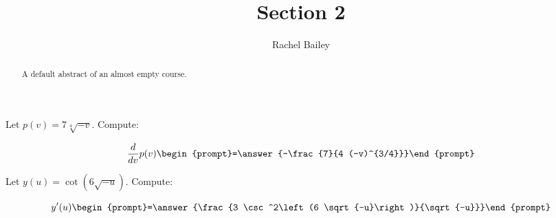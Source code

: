 \documentclass{ximera}
\title{Section 2}
\author{Rachel Bailey}
\begin{document}
\begin{abstract}
    A default abstract of an almost empty course.
\end{abstract}
\maketitle


\begin{exercise}
Let $p(v) = 7 \sqrt[4]{-v}$. Compute:

\[
\frac{d}{dv}p(v)
\begin{prompt}=\answer{-\frac{7}{4 (-v)^{3/4}}}\end{prompt}
\]
\end{exercise}

\begin{exercise}
Let $y(u) = \cot \left(6 \sqrt{-u}\right)$. Compute:

\[
y'(u)
\begin{prompt}=\answer{\frac{3 \csc ^2\left(6 \sqrt{-u}\right)}{\sqrt{-u}}}\end{prompt}
\]
\end{exercise}
\end{document}
